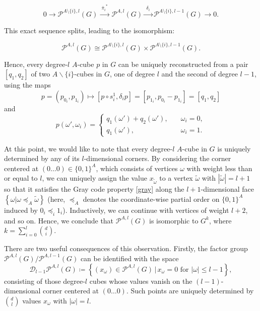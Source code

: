 \documentclass{amsart}
\theoremstyle{definition}
\theoremstyle{remark}
\numberwithin{equation}{section}
\begin{document}
$$ 0 \longrightarrow \mathcal{P}^{A\setminus \{i\},l}(G) \xrightarrow{\phantom{i}{\bar \pi_i}^*\phantom{i}}  \mathcal{P}^{A,l}(G) \xrightarrow{\phantom{i}\delta_i\phantom{i}}  \mathcal{P}^{A\setminus \{i\},l-1}(G) \longrightarrow 0.$$

This exact sequence splits, leading to the isomorphism: 

\begin{equation}
\label{Pdecomp}
    \mathcal{P}^{A,l}(G) \cong  \mathcal{P}^{A\setminus \{i\},l}(G) \times \mathcal{P}^{A\setminus \{i\},l-1}(G).
\end{equation}


Hence, every degree-$l$ $A$-cube $p$ in $G$ can be uniquely reconstructed from a pair $[q_1,q_2]$ of two $A\backslash \{i\}$-cubes in $G$, one of degree $l$ and the second of degree $l-1$, using the maps   
$$ p = (p_{0_i},p_{1_i}) \mapsto [p \circ s_i^1 , \delta_i p] = [p_{1_i},p_{0_i}-p_{1_i}]= [q_1,q_2]$$ 
and 
$$ p(\omega', \omega_i) = \begin{cases} q_1(\omega')+ q_2(\omega'), &\quad \omega_i=0, \\q_1(\omega'), &\quad \omega_i=1. \end{cases}$$

At this point, we would like to note that every degree-$l$ $A$-cube in $G$ is uniquely determined by any of its $l$-dimensional corners. By considering the corner centered at $(0 \dots 0) \in \{0,1\}^A$, which consists of vertices $\omega$ with weight less than or equal to $l$, we
can uniquely assign the value $x_{\tilde\omega}$  to a vertex $\tilde\omega$ with $|\tilde\omega|=l+1$ so that it satisfies the Gray code property \eqref{gray} along the $l+1$-dimensional face $\left\{ \omega | \omega \preceq_A \tilde\omega\right\}$ (here, $\preceq_A$ denotes the coordinate-wise partial order on $\{0,1\}^A$ induced by $0_i \preceq_i 1_i$). Inductively, we can continue with vertices of weight $l+2$, and so on.  
Hence, we conclude that $\mathcal{P}^{A,l}(G)$ is isomorphic to $G^k$, where $k = \sum_{i=0}^l \binom{d}{i} $. 

There are two useful consequences of this observation. Firstly, the factor group $\mathcal{P}^{A,l}(G)/\mathcal{P}^{A,l-1}(G)$ can be identified with the space 
\begin{equation}
\label{DiffP(A,l)}
    \mathcal{D}_{l-1}\mathcal{P}^{A,l}(G) \coloneqq \left\{ (x_\omega) \in \mathcal{P}^{A,l}(G) \, | \, x_\omega = 0 \text{ for } |\omega| \le l-1 \right\},
\end{equation}
consisting of those degree-$l$ cubes whose values vanish on the $(l-1)$-dimensional corner centered at $(0 \dots 0)$. Such points are uniquely determined  by  $ \binom{d}{l} $ values $x_\omega$ with $|\omega| = l$. 
\end{document}
